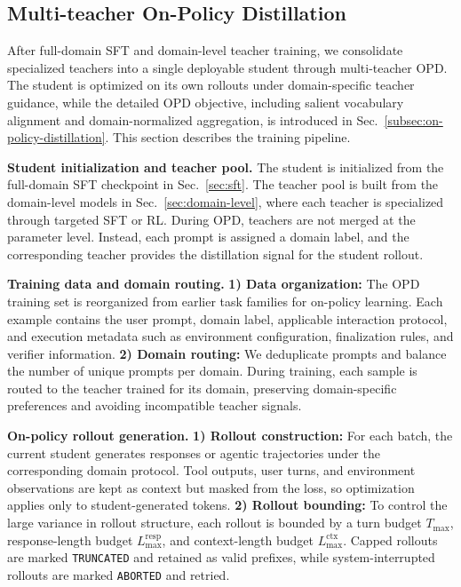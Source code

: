 \documentclass{llmxive}
\begin{document}

\subsection{Multi-teacher On-Policy Distillation}
\label{sec:multi-opd}

After full-domain SFT and domain-level teacher training, we consolidate specialized teachers into a single deployable student through multi-teacher OPD. The student is optimized on its own rollouts under domain-specific teacher guidance, while the detailed OPD objective, including salient vocabulary alignment and domain-normalized aggregation, is introduced in Sec.~\ref{subsec:on-policy-distillation}. This section describes the training pipeline.

\textbf{Student initialization and teacher pool.}
The student is initialized from the full-domain SFT checkpoint in Sec.~\ref{sec:sft}. The teacher pool is built from the domain-level models in Sec.~\ref{sec:domain-level}, where each teacher is specialized through targeted SFT or RL. During OPD, teachers are not merged at the parameter level. Instead, each prompt is assigned a domain label, and the corresponding teacher provides the distillation signal for the student rollout.

\textbf{Training data and domain routing.}
\textbf{1) Data organization:} The OPD training set is reorganized from earlier task families for on-policy learning. Each example contains the user prompt, domain label, applicable interaction protocol, and execution metadata such as environment configuration, finalization rules, and verifier information. 
\textbf{2) Domain routing:} We deduplicate prompts and balance the number of unique prompts per domain. During training, each sample is routed to the teacher trained for its domain, preserving domain-specific preferences and avoiding incompatible teacher signals.

\textbf{On-policy rollout generation.}
\textbf{1) Rollout construction:} For each batch, the current student generates responses or agentic trajectories under the corresponding domain protocol. Tool outputs, user turns, and environment observations are kept as context but masked from the loss, so optimization applies only to student-generated tokens. 
\textbf{2) Rollout bounding:} To control the large variance in rollout structure, each rollout is bounded by a turn budget $T_{\max}$, response-length budget $L_{\max}^{\mathrm{resp}}$, and context-length budget $L_{\max}^{\mathrm{ctx}}$. Capped rollouts are marked \texttt{TRUNCATED} and retained as valid prefixes, while system-interrupted rollouts are marked \texttt{ABORTED} and retried.
\end{document}
